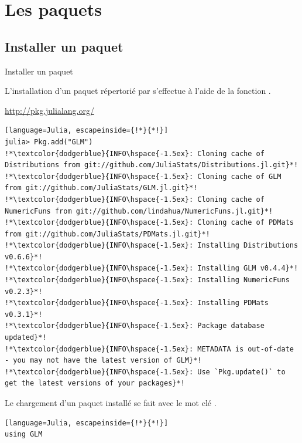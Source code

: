 \section{Les paquets}
\subsection{Installer un paquet}
\begin{frame}[containsverbatim]{Installer un paquet}
\par{L'installation d'un paquet répertorié par {\Julia} s'effectue à l'aide de la fonction .}
\begin{center}\par{\href{http://pkg.julialang.org/}{http\hspace{-0.5ex}://pkg.julialang.org/}}\end{center}
\begin{lstlisting}[language=Julia, escapeinside={!*}{*!}]
julia> Pkg.add("GLM")
!*\textcolor{dodgerblue}{INFO\hspace{-1.5ex}: Cloning cache of Distributions from git://github.com/JuliaStats/Distributions.jl.git}*!
!*\textcolor{dodgerblue}{INFO\hspace{-1.5ex}: Cloning cache of GLM from git://github.com/JuliaStats/GLM.jl.git}*!
!*\textcolor{dodgerblue}{INFO\hspace{-1.5ex}: Cloning cache of NumericFuns from git://github.com/lindahua/NumericFuns.jl.git}*!
!*\textcolor{dodgerblue}{INFO\hspace{-1.5ex}: Cloning cache of PDMats from git://github.com/JuliaStats/PDMats.jl.git}*!
!*\textcolor{dodgerblue}{INFO\hspace{-1.5ex}: Installing Distributions v0.6.6}*!
!*\textcolor{dodgerblue}{INFO\hspace{-1.5ex}: Installing GLM v0.4.4}*!
!*\textcolor{dodgerblue}{INFO\hspace{-1.5ex}: Installing NumericFuns v0.2.3}*!
!*\textcolor{dodgerblue}{INFO\hspace{-1.5ex}: Installing PDMats v0.3.1}*!
!*\textcolor{dodgerblue}{INFO\hspace{-1.5ex}: Package database updated}*!
!*\textcolor{dodgerblue}{INFO\hspace{-1.5ex}: METADATA is out-of-date - you may not have the latest version of GLM}*!
!*\textcolor{dodgerblue}{INFO\hspace{-1.5ex}: Use `Pkg.update()` to get the latest versions of your packages}*!
\end{lstlisting}
\vspace{2ex}
\par{Le chargement d'un paquet installé se fait avec le mot clé .}
\begin{lstlisting}[language=Julia, escapeinside={!*}{*!}]
using GLM
\end{lstlisting}
\end{frame}


